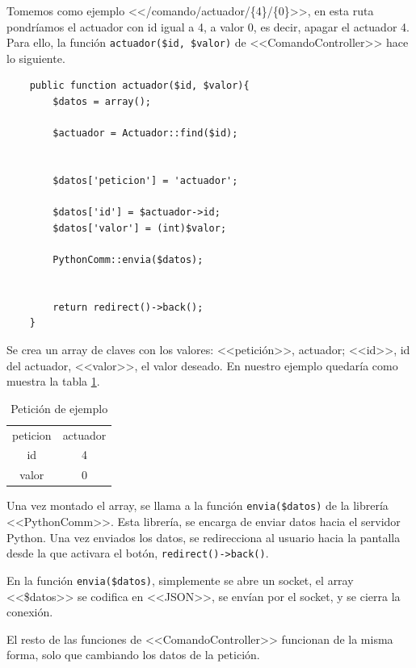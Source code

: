     Tomemos como ejemplo <</comando/actuador/\{4\}/\{0\}>>, en esta ruta pondríamos el actuador con id igual a 4, a valor 0, es decir, apagar el actuador 4. Para ello, la función \lstinline|actuador($id, $valor)| de <<ComandoController>> hace lo siguiente.
    
    \begin{lstlisting}
    public function actuador($id, $valor){
        $datos = array();
    
        $actuador = Actuador::find($id);
    
    
        $datos['peticion'] = 'actuador';
    
        $datos['id'] = $actuador->id;
        $datos['valor'] = (int)$valor;
    
        PythonComm::envia($datos);
    
    
        return redirect()->back();
    }
    \end{lstlisting}
    
    Se crea un array de claves con los valores: <<petición>>, actuador; <<id>>, id del actuador, <<valor>>, el valor deseado. En nuestro ejemplo quedaría como muestra la tabla \ref{tab:pet_ejem}.
    
    \begin{table}[h]
        \centering
        \begin{tabular}{c|c}
            \toprule
            peticion & actuador  \\ 
            id & 4       \\ 
            valor & 0    \\\bottomrule
        \end{tabular}
        \caption{Petición de ejemplo}
        \label{tab:pet_ejem}
    \end{table}
    
    Una vez montado el array, se llama a la función \lstinline|envia($datos)| de la librería <<PythonComm>>. Esta librería, se encarga de enviar datos hacia el servidor Python. Una vez enviados los datos, se redirecciona al usuario hacia la pantalla desde la que activara el botón, \lstinline|redirect()->back()|.
    
    En la función \lstinline|envia($datos)|, simplemente se abre un socket, el array <<\$datos>> se codifica en <<JSON>>, se envían por el socket, y se cierra la conexión. 
    
    El resto de las funciones de <<ComandoController>> funcionan de la misma forma, solo que cambiando los datos de la petición.
    
